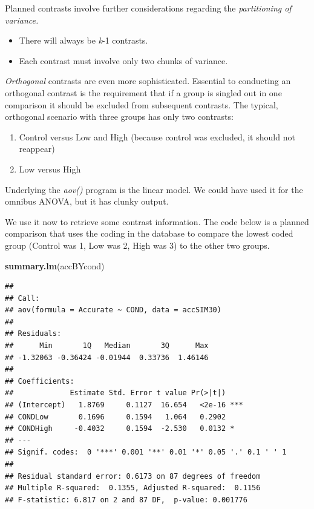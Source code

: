 \documentclass[
  english,
]{book}
\newenvironment{Shaded}{\begin{snugshade}}{\end{snugshade}}
\newcommand{\KeywordTok}[1]{\textcolor[rgb]{0.13,0.29,0.53}{\textbf{#1}}}
\newcommand{\NormalTok}[1]{#1}
\providecommand{\tightlist}{%
  \setlength{\itemsep}{0pt}\setlength{\parskip}{0pt}}
\begin{document}
Planned contrasts involve further considerations regarding the \emph{partitioning of variance.}

\begin{itemize}
\tightlist
\item
  There will always be \emph{k}-1 contrasts.
\item
  Each contrast must involve only two chunks of variance.
\end{itemize}

\emph{Orthogonal} contrasts are even more sophisticated. Essential to conducting an orthogonal contrast is the requirement that if a group is singled out in one comparison it should be excluded from subsequent contrasts. The typical, orthogonal scenario with three groups has only two contrasts:

\begin{enumerate}
\def\labelenumi{\arabic{enumi}.}
\tightlist
\item
  Control versus Low and High (because control was excluded, it should not reappear)
\item
  Low versus High
\end{enumerate}

Underlying the \emph{aov()} program is the linear model. We could have used it for the omnibus ANOVA, but it has clunky output.

We use it now to retrieve some contrast information. The code below is a planned comparison that uses the coding in the database to compare the lowest coded group (Control was 1, Low was 2, High was 3) to the other two groups.

\begin{Shaded}
\begin{Highlighting}[]
\KeywordTok{summary.lm}\NormalTok{(accBYcond)}
\end{Highlighting}
\end{Shaded}

\begin{verbatim}
## 
## Call:
## aov(formula = Accurate ~ COND, data = accSIM30)
## 
## Residuals:
##      Min       1Q   Median       3Q      Max 
## -1.32063 -0.36424 -0.01944  0.33736  1.46146 
## 
## Coefficients:
##             Estimate Std. Error t value Pr(>|t|)    
## (Intercept)   1.8769     0.1127  16.654   <2e-16 ***
## CONDLow       0.1696     0.1594   1.064   0.2902    
## CONDHigh     -0.4032     0.1594  -2.530   0.0132 *  
## ---
## Signif. codes:  0 '***' 0.001 '**' 0.01 '*' 0.05 '.' 0.1 ' ' 1
## 
## Residual standard error: 0.6173 on 87 degrees of freedom
## Multiple R-squared:  0.1355, Adjusted R-squared:  0.1156 
## F-statistic: 6.817 on 2 and 87 DF,  p-value: 0.001776
\end{verbatim}
\end{document}

